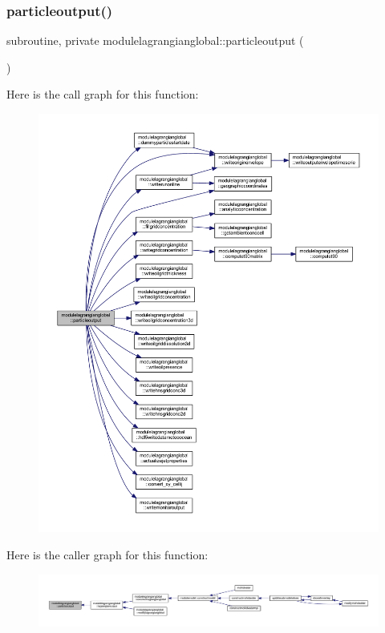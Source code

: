 \subsubsection{\texorpdfstring{particleoutput()}{particleoutput()}}
{\footnotesize\ttfamily subroutine, private modulelagrangianglobal\+::particleoutput (\begin{DoxyParamCaption}{ }\end{DoxyParamCaption})\hspace{0.3cm}{\ttfamily [private]}}

Here is the call graph for this function\+:\nopagebreak
\begin{figure}[H]
\begin{center}
\leavevmode
\includegraphics[width=350pt]{namespacemodulelagrangianglobal_af6d6a080c97a72125b4959aa01edffd8_cgraph}
\end{center}
\end{figure}
Here is the caller graph for this function\+:\nopagebreak
\begin{figure}[H]
\begin{center}
\leavevmode
\includegraphics[width=350pt]{namespacemodulelagrangianglobal_af6d6a080c97a72125b4959aa01edffd8_icgraph}
\end{center}
\end{figure}
\mbox{\label{namespacemodulelagrangianglobal_a59c3bacd80d2e9730bbf1bae5ae46304}} 
